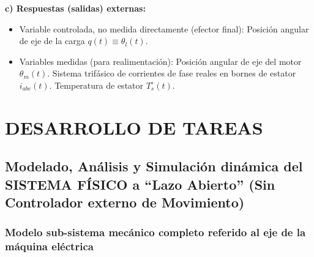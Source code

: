 \documentclass[a4paper, 10pt, onecolumn,journal]{ieeeconf}
\begin{document}
\textbf{c) Respuestas (salidas) externas:}
\begin{itemize}
    \item Variable controlada, no medida directamente (efector final): Posición angular de eje de la carga $q(t) \equiv \theta_l(t)$.
    \item Variables medidas (para realimentación): Posición angular de eje del motor $\theta_m(t)$. Sistema trifásico de corrientes de fase reales en bornes de estator $i_{abc}(t)$. Temperatura de estator $T_s^{\circ}(t)$.
\end{itemize}

















\section{DESARROLLO DE TAREAS}

\subsection{\textbf{Modelado, Análisis y Simulación dinámica del SISTEMA FÍSICO a “Lazo
Abierto” (Sin Controlador externo de Movimiento)}}

\subsubsection{\textbf{Modelo sub-sistema mecánico completo referido al eje de la máquina eléctrica}}
\end{document}
